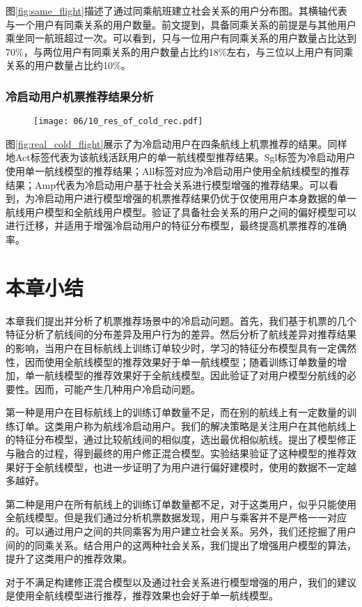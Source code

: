 图\ref{fig:same_flight}描述了通过同乘航班建立社会关系的用户分布图。其横轴代表与一个用户有同乘关系的用户数量。前文提到，具备同乘关系的前提是与其他用户乘坐同一航班超过一次。可以看到，只与一位用户有同乘关系的用户数量占比达到70\%，与两位用户有同乘关系的用户数量占比约18\%左右，与三位以上用户有同乘关系的用户数量占比约10\%。

\subsubsection{冷启动用户机票推荐结果分析}

\begin{figure}
 \centering
 \texttt{[image: 06/10\_res\_of\_cold\_rec.pdf]}
\end{figure}

图\ref{fig:real_cold_flight}展示了为冷启动用户在四条航线上机票推荐的结果。同样地Act标签代表为该航线活跃用户的单一航线模型推荐结果。Sgl标签为冷启动用户使用单一航线模型的推荐结果；All标签对应为冷启动用户使用全航线模型的推荐结果；Amp代表为冷启动用户基于社会关系进行模型增强的推荐结果。可以看到，为冷启动用户进行模型增强的机票推荐结果仍优于仅使用用户本身数据的单一航线用户模型和全航线用户模型。验证了具备社会关系的用户之间的偏好模型可以进行迁移，并适用于增强冷启动用户的特征分布模型，最终提高机票推荐的准确率。


\section{本章小结}
本章我们提出并分析了机票推荐场景中的冷启动问题。首先，我们基于机票的几个特征分析了航线间的分布差异及用户行为的差异。然后分析了航线差异对推荐结果的影响，当用户在目标航线上训练订单较少时，学习的特征分布模型具有一定偶然性，因而使用全航线模型的推荐效果好于单一航线模型；随着训练订单数量的增加，单一航线模型的推荐效果好于全航线模型。因此验证了对用户模型分航线的必要性。因而，可能产生几种用户冷启动问题。

第一种是用户在目标航线上的训练订单数量不足，而在别的航线上有一定数量的训练订单。这类用户称为航线冷启动用户。我们的解决策略是关注用户在其他航线上的特征分布模型，通过比较航线间的相似度，选出最优相似航线。提出了模型修正与融合的过程，得到最终的用户修正混合模型。实验结果验证了这种模型的推荐效果好于全航线模型，也进一步证明了为用户进行偏好建模时，使用的数据不一定越多越好。

第二种是用户在所有航线上的训练订单数量都不足，对于这类用户，似乎只能使用全航线模型。但是我们通过分析机票数据发现，用户与乘客并不是严格一一对应的。可以通过用户之间的共同乘客为用户建立社会关系。另外，我们还挖掘了用户间的的同乘关系。结合用户的这两种社会关系，我们提出了增强用户模型的算法，提升了这类用户的推荐效果。

对于不满足构建修正混合模型以及通过社会关系进行模型增强的用户，我们的建议是使用全航线模型进行推荐，推荐效果也会好于单一航线模型。